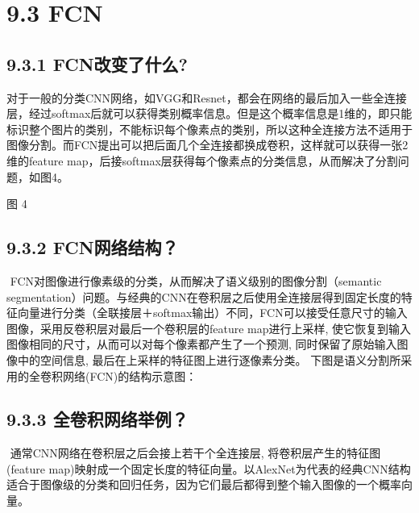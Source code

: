 \section{9.3 FCN}\label{fcn}

\subsection{9.3.1
FCN改变了什么?}\label{fcnux6539ux53d8ux4e86ux4ec0ux4e48}

​
对于一般的分类CNN网络，如VGG和Resnet，都会在网络的最后加入一些全连接层，经过softmax后就可以获得类别概率信息。但是这个概率信息是1维的，即只能标识整个图片的类别，不能标识每个像素点的类别，所以这种全连接方法不适用于图像分割。
​
而FCN提出可以把后面几个全连接都换成卷积，这样就可以获得一张2维的feature
map，后接softmax层获得每个像素点的分类信息，从而解决了分割问题，如图4。

\begin{figure}
\centering
\end{figure}

图 4

\subsection{9.3.2 FCN网络结构？}\label{fcnux7f51ux7edcux7ed3ux6784}

​ FCN对图像进行像素级的分类，从而解决了语义级别的图像分割（semantic
segmentation）问题。与经典的CNN在卷积层之后使用全连接层得到固定长度的特征向量进行分类（全联接层＋softmax输出）不同，FCN可以接受任意尺寸的输入图像，采用反卷积层对最后一个卷积层的feature
map进行上采样,
使它恢复到输入图像相同的尺寸，从而可以对每个像素都产生了一个预测,
同时保留了原始输入图像中的空间信息,
最后在上采样的特征图上进行逐像素分类。 ​
下图是语义分割所采用的全卷积网络(FCN)的结构示意图：

\begin{figure}
\centering
\end{figure}

\subsection{9.3.3
全卷积网络举例？}\label{ux5168ux5377ux79efux7f51ux7edcux4e3eux4f8b}

​ 通常CNN网络在卷积层之后会接上若干个全连接层,
将卷积层产生的特征图(feature
map)映射成一个固定长度的特征向量。以AlexNet为代表的经典CNN结构适合于图像级的分类和回归任务，因为它们最后都得到整个输入图像的一个概率向量。

